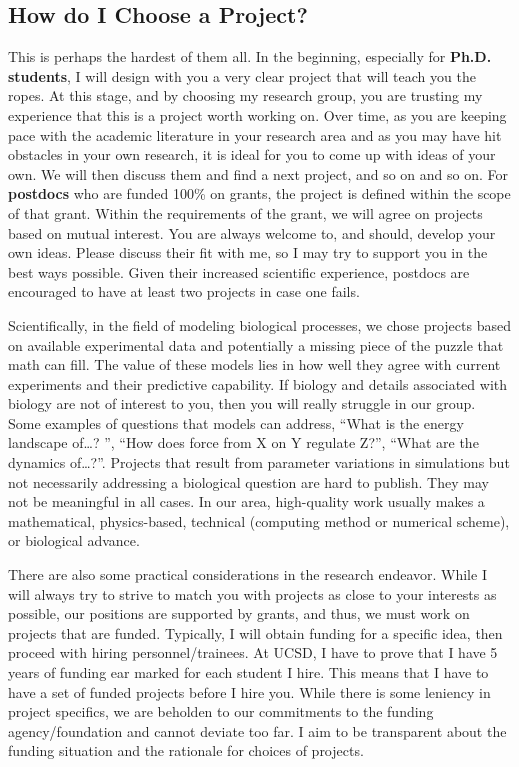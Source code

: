\documentclass[12pt]{article}
\begin{document}
\subsection{How do I Choose a Project?}
This is perhaps the hardest of them all.
In the beginning, especially for \textbf{Ph.D. students}, I will design with you a very clear project that will teach you the ropes.
At this stage, and by choosing my research group, you are trusting my experience that this is a project worth working on.
Over time, as you are keeping pace with the academic literature in your research area and as you may have hit obstacles in your own research, it is ideal for you to come up with ideas of your own.
We will then discuss them and find a next project, and so on and so on.
For \textbf{postdocs} who are funded 100\% on grants, the project is defined within the scope of that grant.
Within the requirements of the grant, we will agree on projects based on mutual interest.
You are always welcome to, and should, develop your own ideas.
Please discuss their fit with me, so I may try to support you in the best ways possible.
Given their increased scientific experience, postdocs are encouraged to have at least two projects in case one fails.

Scientifically, in the field of modeling biological processes, we chose projects based on available experimental data and potentially a missing piece of the puzzle that math can fill.
The value of these models lies in how well they agree with current experiments and their predictive capability.
If biology and details associated with biology are not of interest to you, then you will really struggle in our group.
Some examples of questions that models can address, ``What is the energy landscape of\ldots?
'', ``How does force from X on Y regulate Z?'', ``What are the dynamics of\ldots?''.
Projects that result from parameter variations in simulations but not necessarily addressing a biological question are hard to publish.
They may not be meaningful in all cases.
In our area, high-quality work usually makes a mathematical, physics-based, technical (computing method or numerical scheme), or biological advance.

There are also some practical considerations in the research endeavor.
While I will always try to strive to match you with projects as close to your interests as possible, our positions are supported by grants, and thus, we must work on projects that are funded.
Typically, I will obtain funding for a specific idea, then proceed with hiring personnel/trainees.
At UCSD, I have to prove that I have 5 years of funding ear marked for each student I hire.
This means that I have to have a set of funded projects before I hire you.
While there is some leniency in project specifics, we are beholden to our commitments to the funding agency/foundation and cannot deviate too far.
I aim to be transparent about the funding situation and the rationale for choices of projects.
\end{document}
